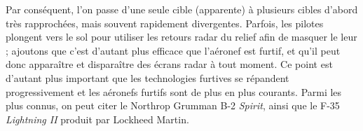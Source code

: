 	
	Par conséquent, l'on passe d'une seule cible (apparente) à plusieurs cibles d'abord très rapprochées, mais souvent rapidement divergentes. Parfois, les pilotes plongent vers le sol pour utiliser les retours radar du relief afin de masquer le leur ; ajoutons que c'est d'autant plus efficace que l'aéronef est furtif, et qu'il peut donc apparaître et disparaître des écrans radar à tout moment. Ce point est d'autant plus important que les technologies furtives se répandent progressivement et les aéronefs furtifs sont de plus en plus courants. Parmi les plus connus, on peut citer le Northrop Grumman B-2 \emph{Spirit}, ainsi que le F-35 \emph{Lightning II} produit par Lockheed Martin.	
	
	\newcommand{\subImgAircraftW}{0.74\textwidth}
